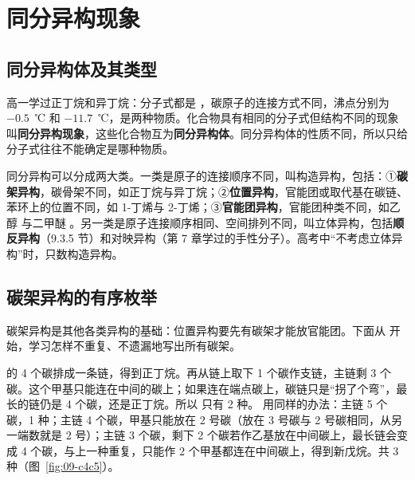 \section{同分异构现象}

\subsection{同分异构体及其类型}
高一学过正丁烷和异丁烷：分子式都是 ，碳原子的连接方式不同，沸点分别为 $-0.5$~℃ 和 $-11.7$~℃，是两种物质。化合物具有相同的分子式但结构不同的现象叫\textbf{同分异构现象}，这些化合物互为\textbf{同分异构体}。同分异构体的性质不同，所以只给分子式往往不能确定是哪种物质。

同分异构可以分成两大类。一类是原子的连接顺序不同，叫构造异构，包括：①\textbf{碳架异构}，碳骨架不同，如正丁烷与异丁烷；②\textbf{位置异构}，官能团或取代基在碳链、苯环上的位置不同，如 1-丁烯与 2-丁烯；③\textbf{官能团异构}，官能团种类不同，如乙醇  与二甲醚 。另一类是原子连接顺序相同、空间排列不同，叫立体异构，包括\textbf{顺反异构}（9.3.5 节）和对映异构（第 7 章学过的手性分子）。高考中“不考虑立体异构”时，只数构造异构。

\subsection{碳架异构的有序枚举}
碳架异构是其他各类异构的基础：位置异构要先有碳架才能放官能团。下面从  开始，学习怎样不重复、不遗漏地写出所有碳架。

 的 4 个碳排成一条链，得到正丁烷。再从链上取下 1 个碳作支链，主链剩 3 个碳。这个甲基只能连在中间的碳上；如果连在端点碳上，碳链只是“拐了个弯”，最长的链仍是 4 个碳，还是正丁烷。所以  只有 2 种。 用同样的办法：主链 5 个碳，1 种；主链 4 个碳，甲基只能放在 2 号碳（放在 3 号碳与 2 号碳相同，从另一端数就是 2 号）；主链 3 个碳，剩下 2 个碳若作乙基放在中间碳上，最长链会变成 4 个碳，与上一种重复，只能作 2 个甲基都连在中间碳上，得到新戊烷。共 3 种（图~\ref{fig:09-c4c5}）。

